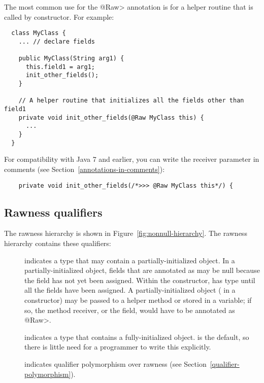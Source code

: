 The most common use for the \<@Raw> annotation is for a helper routine that
is called by constructor.  For example:

\begin{Verbatim}
  class MyClass {
    ... // declare fields

    public MyClass(String arg1) {
      this.field1 = arg1;
      init_other_fields();
    }

    // A helper routine that initializes all the fields other than field1
    private void init_other_fields(@Raw MyClass this) {
      ...
    }
  }
\end{Verbatim}

For compatibility with Java 7 and earlier, you can write the receiver
parameter in comments (see Section~\ref{annotations-in-comments}):
\begin{Verbatim}
    private void init_other_fields(/*>>> @Raw MyClass this*/) {
\end{Verbatim}


\subsection{Rawness qualifiers\label{rawness-qualifiers}}

The rawness hierarchy is shown in Figure~\ref{fig:nonnull-hierarchy}.
The rawness hierarchy contains these qualifiers:

\begin{description}

\item[]
  indicates a type that may contain a partially-initialized object.  In a
  partially-initialized object, fields that are annotated as
   may be null because the field
  has not yet been assigned.  Within the constructor,
   has  type until all
  the  fields have been assigned.
  A partially-initialized object ( in a constructor) may be
  passed to a helper method or stored in a variable; if so, the method
  receiver, or the field, would have to be annotated as \<@Raw>.

\item[]
  indicates a type that contains a fully-initialized object.  
  is the default, so there is little need for a programmer to write this
  explicitly.

\item[]
  indicates qualifier polymorphism over rawness (see
  Section~\ref{qualifier-polymorphism}).

\end{description}

